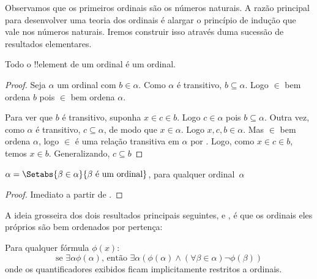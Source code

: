 \documentclass[../../../include/open-logic-section]{subfiles}
\begin{document}

Observamos que os primeiros ordinais são os números naturais. A razão
principal para desenvolver uma teoria dos ordinais é alargar o
princípio de indução que vale nos números naturais. Iremos construir
isso através duma sucessão de resultados elementares.

\begin{lem}
Todo o !!{element} de um ordinal é um ordinal.
\end{lem}

\begin{proof}
Seja $\alpha$ um ordinal com $b \in \alpha$. Como $\alpha$ é
transitivo, $b \subseteq \alpha$. Logo $\in$ bem ordena $b$ pois $\in$
bem ordena $\alpha$.

Para ver que $b$ é transitivo, suponha $x \in c \in b$. Logo $c \in \alpha$ pois $b
\subseteq \alpha$. Outra vez, como $\alpha$ é transitivo, $c \subseteq
\alpha$, de modo que $x \in \alpha$. Logo $x, c, b \in \alpha$. Mas $\in$
bem ordena $\alpha$, logo $\in$ é uma relação transitiva em
$\alpha$ por . Logo, como $x
\in c \in b$, temos $x \in b$. Generalizando, $c \subseteq b$
\end{proof}

\begin{cor}
$\alpha = \Setabs{\beta \in \alpha}{\beta \text{ é um ordinal}}$, para
qualquer ordinal~$\alpha$
\end{cor}

\begin{proof}
Imediato a partir de .
\end{proof}

A ideia grosseira dos dois resultados principais seguintes,
 e , é que os
ordinais eles próprios são bem ordenados por pertença:

\begin{thm}
Para qualquer fórmula $\phi(x)$: 	
\[
	\text{se }\exists \alpha \phi(\alpha)\text{, então }\exists \alpha(\phi(\alpha)
	\land  (\forall \beta \in \alpha) \lnot \phi(\beta))
\]
onde os quantificadores exibidos ficam implicitamente restritos a ordinais.
\end{thm}
\end{document}
